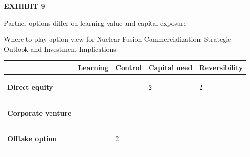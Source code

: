 \documentclass[10pt,a4paper]{article}
\begin{document}
\clearpage
{\textcolor{BOGreen}{\scriptsize\bfseries EXHIBIT 9}}\par\vspace{4pt}
{\sffamily\fontsize{17}{21}\selectfont\color{BONavy} Partner options differ on learning value and capital exposure}\par
{\small\color{BOText} Where-to-play option view for Nuclear Fusion Commercialization: Strategic Outlook and Investment Implications}\par\vspace{6pt}
{\scriptsize\begin{tabular}{p{38mm}>{\centering\arraybackslash}p{21mm}>{\centering\arraybackslash}p{21mm}>{\centering\arraybackslash}p{21mm}>{\centering\arraybackslash}p{21mm}}
 & {\bfseries Learning} & {\bfseries Control} & {\bfseries Capital need} & {\bfseries Reversibility} \\
\hline
{\bfseries Direct equity} & \colorbox{BOGreen}{\textcolor{white}{\strut\hspace{5pt}5\hspace{5pt}}} & \colorbox{BOGreen}{\textcolor{white}{\strut\hspace{5pt}4\hspace{5pt}}} & \colorbox{BOLight}{\textcolor{BOText}{\strut\hspace{5pt}2\hspace{5pt}}} & \colorbox{BOLight}{\textcolor{BOText}{\strut\hspace{5pt}2\hspace{5pt}}} \\
{\bfseries Corporate venture} & \colorbox{BOGreen}{\textcolor{white}{\strut\hspace{5pt}4\hspace{5pt}}} & \colorbox{BOBlue}{\textcolor{white}{\strut\hspace{5pt}3\hspace{5pt}}} & \colorbox{BOBlue}{\textcolor{white}{\strut\hspace{5pt}3\hspace{5pt}}} & \colorbox{BOBlue}{\textcolor{white}{\strut\hspace{5pt}3\hspace{5pt}}} \\
{\bfseries Offtake option} & \colorbox{BOBlue}{\textcolor{white}{\strut\hspace{5pt}3\hspace{5pt}}} & \colorbox{BOLight}{\textcolor{BOText}{\strut\hspace{5pt}2\hspace{5pt}}} & \colorbox{BOGreen}{\textcolor{white}{\strut\hspace{5pt}4\hspace{5pt}}} & \colorbox{BOGreen}{\textcolor{white}{\strut\hspace{5pt}4\hspace{5pt}}} \\

\end{tabular}}
\end{document}
